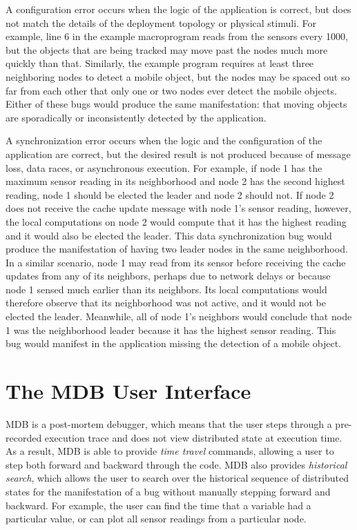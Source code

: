  A configuration error occurs when
the logic of the application is correct, but does not match the details of the
deployment topology or physical stimuli.  For example, line 6 in the example
macroprogram reads from the sensors every 1000\ms, but the objects that are
being tracked may move past the nodes much more quickly than that.  Similarly,
the example program requires at least three neighboring nodes to detect a mobile
object, but the nodes may be spaced out so far from each other that only one or
two nodes ever detect the mobile objects.  Either of these bugs would produce
the same manifestation: that moving objects are sporadically or inconsistently
detected by the application.

 A synchronization error occurs
when the logic and the configuration of the application are correct, but the
desired result is not produced because of message loss, data races, or
asynchronous execution.  For example, if node 1 has the maximum sensor reading
in its neighborhood and node 2 has the second highest reading, node 1 should be
elected the leader and node 2 should not.  If node 2 does not receive the cache
update message with node 1's sensor reading, however, the local computations on
node 2 would compute that it has the highest reading and it would also be
elected the leader.  This data synchronization bug would produce the
manifestation of having two leader nodes in the same neighborhood.  In a similar
scenario, node 1 may read from its sensor before receiving the cache updates
from any of its neighbors, perhaps due to network delays or because node 1
sensed much earlier than its neighbors.  Its local computations would therefore
observe that its neighborhood was not active, and it would not be elected the
leader.  Meanwhile, all of node 1's neighbors would conclude that node 1 was the
neighborhood leader because it has the highest sensor reading.  This bug would
manifest in the application missing the detection of a mobile object.


\section{The MDB User Interface} \label{Interface} \label{logging}

MDB is a post-mortem debugger, which means that the user steps through a
pre-recorded execution trace and does not view distributed state at execution
time.  As a result, MDB is able to provide \emph{time travel} commands, allowing
a user to step both forward and backward through the code.  MDB also provides
\emph{historical search}, which allows the user to search over the historical
sequence of distributed states for the manifestation of a bug without manually
stepping forward and backward.  For example, the user can find the time that a
variable had a particular value, or can plot all sensor readings from a
particular node.

